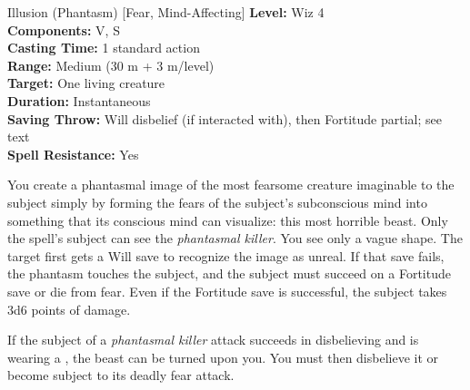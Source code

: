 {Illusion (Phantasm) [Fear, Mind-Affecting]}
{
	\textbf{Level:}
	Wiz 4\\
	\textbf{Components:}
	V, S\\
	\textbf{Casting Time:}
	1 standard action\\
	\textbf{Range:}
	Medium (30 m + 3 m/level)\\
	\textbf{Target:}
	One living creature\\
	\textbf{Duration:}
	Instantaneous\\
	\textbf{Saving Throw:}
	Will disbelief (if interacted with), then Fortitude partial; see text\\
	\textbf{Spell Resistance:}
	Yes\\
}
{
	You create a phantasmal image of the most fearsome creature imaginable to the subject simply by forming the fears of the subject's subconscious mind into something that its conscious mind can visualize: this most horrible beast. Only the spell's subject can see the \emph{phantasmal killer}. You see only a vague shape. The target first gets a Will save to recognize the image as unreal. If that save fails, the phantasm touches the subject, and the subject must succeed on a Fortitude save or die from fear. Even if the Fortitude save is successful, the subject takes 3d6 points of damage.

	If the subject of a \emph{phantasmal killer} attack succeeds in disbelieving and is wearing a , the beast can be turned upon you. You must then disbelieve it or become subject to its deadly fear attack.

}
